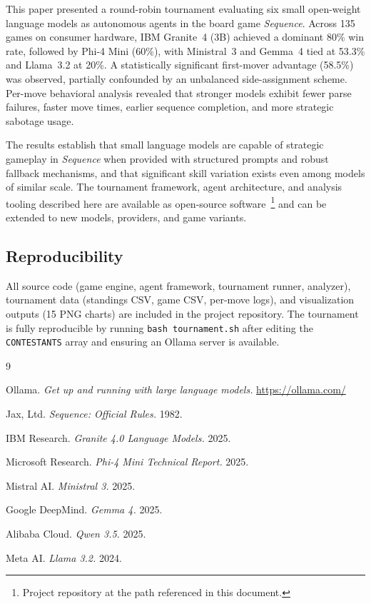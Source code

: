 \documentclass[11pt]{article}
\begin{document}
This paper presented a round-robin tournament evaluating six small open-weight language models as autonomous agents in the board game \textit{Sequence}. Across 135 games on consumer hardware, IBM Granite~4 (3B) achieved a dominant 80\% win rate, followed by Phi-4 Mini (60\%), with Ministral~3 and Gemma~4 tied at 53.3\% and Llama~3.2 at 20\%. A statistically significant first-mover advantage (58.5\%) was observed, partially confounded by an unbalanced side-assignment scheme. Per-move behavioral analysis revealed that stronger models exhibit fewer parse failures, faster move times, earlier sequence completion, and more strategic sabotage usage.

The results establish that small language models are capable of strategic gameplay in \textit{Sequence} when provided with structured prompts and robust fallback mechanisms, and that significant skill variation exists even among models of similar scale. The tournament framework, agent architecture, and analysis tooling described here are available as open-source software~\footnote{Project repository at the path referenced in this document.} and can be extended to new models, providers, and game variants.

\subsection*{Reproducibility}

All source code (game engine, agent framework, tournament runner, analyzer), tournament data (standings CSV, game CSV, per-move logs), and visualization outputs (15 PNG charts) are included in the project repository. The tournament is fully reproducible by running \texttt{bash tournament.sh} after editing the \texttt{CONTESTANTS} array and ensuring an Ollama server is available.


\begin{thebibliography}{9}

Ollama. \textit{Get up and running with large language models.} \url{https://ollama.com/}

Jax, Ltd. \textit{Sequence: Official Rules.} 1982.

IBM Research. \textit{Granite 4.0 Language Models.} 2025.

Microsoft Research. \textit{Phi-4 Mini Technical Report.} 2025.

Mistral AI. \textit{Ministral 3.} 2025.

Google DeepMind. \textit{Gemma 4.} 2025.

Alibaba Cloud. \textit{Qwen 3.5.} 2025.

Meta AI. \textit{Llama 3.2.} 2024.

\end{thebibliography}
\end{document}
